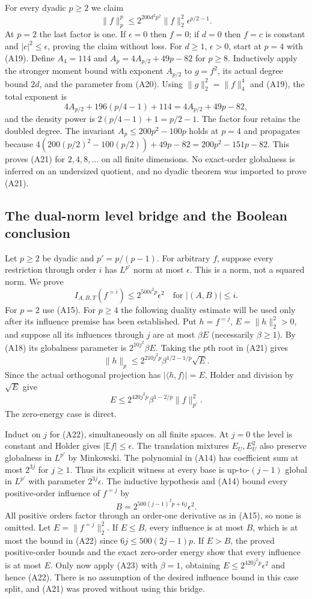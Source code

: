 For every dyadic $p\ge2$ we claim
\[
 \|f\|_p^p\le2^{200d^2p^2}\|f\|_2^2
                         \epsilon^{p/2-1}.         \tag{A21}
\]
At $p=2$ the last factor is one. If $\epsilon=0$ then $f=0$; if $d=0$
then $f=c$ is constant and $|c|^2\le\epsilon$, proving the claim
without loss. For $d\ge1$, $\epsilon>0$, start at $p=4$ with (A19).
Define $A_4=114$ and $A_p=4A_{p/2}+49p-82$ for $p\ge8$.
Inductively apply the stronger moment bound with exponent $A_{p/2}$
to $g=f^2$, its actual degree bound $2d$, and the parameter from (A20).
Using $\|g\|_2^2=\|f\|_4^4$ and (A19), the total exponent is
\[
 4A_{p/2}+196(p/4-1)+114=4A_{p/2}+49p-82,
\]
and the density power is $2(p/4-1)+1=p/2-1$.
The factor four retains the doubled degree. The invariant
$A_p\le200p^2-100p$ holds at $p=4$ and propagates because
$4(200(p/2)^2-100(p/2))+49p-82=200p^2-151p-82$.
This proves (A21) for $2,4,8,\ldots$ on all finite dimensions.
No exact-order globalness is inferred on an undersized quotient, and
no dyadic theorem was imported to prove (A21).

\subsection{The dual-norm level bridge and the Boolean conclusion}
Let $p\ge2$ be dyadic and $p'=p/(p-1)$. For arbitrary $f$, suppose every
restriction through order $i$ has $L^{p'}$ norm at most $\epsilon$.
This is a norm, not a squared norm. We prove
\[
 I_{A,B,T}(f^{=i})\le2^{500i^2p}\epsilon^2
 \quad\text{for }|(A,B)|\le i.                     \tag{A22}
\]
For $p=2$ use (A15). For $p\ge4$ the following duality estimate will be
used only after its influence premise has been established.
Put $h=f^{=j}$, $E=\|h\|_2^2>0$, and suppose all its influences through
$j$ are at most $\beta E$ (necessarily $\beta\ge1$).
By (A18) its globalness parameter is $2^{10j^2}\beta E$.
Taking the $p$th root in (A21) gives
\[
 \|h\|_p\le2^{210j^2p}\beta^{1/2-1/p}\sqrt E.
\]
Since the actual orthogonal projection has $|\langle h,f\rangle|=E$,
Holder and division by $\sqrt E$ give
\[
 E\le2^{420j^2p}\beta^{1-2/p}\|f\|_{p'}^2.          \tag{A23}
\]
The zero-energy case is direct.

Induct on $j$ for (A22), simultaneously on all finite spaces.
At $j=0$ the level is constant and Holder gives $|\mathbb Ef|\le\epsilon$.
The translation mixtures $E_U,E_U^2$ also preserve globalness in
$L^{p'}$ by Minkowski. The polynomial in (A14) has coefficient sum at
most $2^{3j}$ for $j\ge1$. Thus its explicit witness at every base is
up-to-$(j-1)$ global in $L^{p'}$ with parameter $2^{3j}\epsilon$.
The inductive hypothesis and (A14) bound every positive-order influence
of $f^{=j}$ by
\[
 B=2^{500(j-1)^2p+6j}\epsilon^2.
\]
All positive orders factor through an order-one derivative as in
(A15), so none is omitted. Let $E=\|f^{=j}\|_2^2$.
If $E\le B$, every influence is at most $B$, which is at most the bound
in (A22) since $6j\le500(2j-1)p$.
If $E>B$, the proved positive-order bounds and the exact zero-order
energy show that every influence is at most $E$. Only now apply (A23)
with $\beta=1$, obtaining $E\le2^{420j^2p}\epsilon^2$ and hence (A22).
There is no assumption of the desired influence bound in this case
split, and (A21) was proved without using this bridge.

